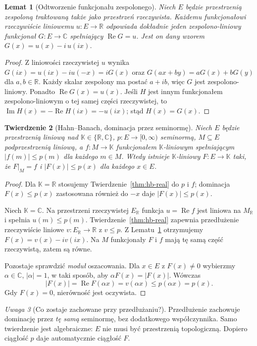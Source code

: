 \documentclass[11pt,a4paper]{article}
\numberwithin{equation}{section}
\theoremstyle{plain}
\newtheorem{twierdzenie}{Twierdzenie}[section]
\newtheorem{lemat}[twierdzenie]{Lemat}
\theoremstyle{definition}
\theoremstyle{remark}
\newtheorem{uwaga}[twierdzenie]{Uwaga}
\newcommand{\R}{\mathbb R}
\newcommand{\C}{\mathbb C}
\newcommand{\K}{\mathbb K}
\begin{document}
\begin{lemat}[Odtworzenie funkcjonału zespolonego]
\label{lem:complex-real-part}
Niech $E$ będzie przestrzenią zespoloną traktowaną także
jako przestrzeń rzeczywista. Każdemu funkcjonałowi
rzeczywiście liniowemu $u:E\to\R$ odpowiada dokładnie
jeden zespolono-liniowy funkcjonał $G:E\to\C$ spełniający
$\operatorname{Re}G=u$. Jest on dany wzorem
$G(x)=u(x)-i\,u(ix)$.
\end{lemat}
\begin{proof}
Z liniowości rzeczywistej $u$ wynika
$G(ix)=u(ix)-i u(-x)=iG(x)$ oraz
$G(ax+by)=aG(x)+bG(y)$ dla $a,b\in\R$.
Każdy skalar zespolony ma postać $a+ib$, więc $G$ jest
zespolono-liniowy. Ponadto $\operatorname{Re}G(x)=u(x)$.
Jeśli $H$ jest innym funkcjonałem zespolono-liniowym
o tej samej części rzeczywistej, to
$\operatorname{Im}H(x)=-\operatorname{Re}H(ix)=-u(ix)$;
stąd $H(x)=G(x)$.
\end{proof}

\begin{twierdzenie}[Hahn--Banach, dominacja przez seminormę]
\label{thm:hb-complex-seminorm}
Niech $E$ będzie przestrzenią liniową nad
$\K\in\{\R,\C\}$, $p:E\to[0,\infty)$ seminormą,
$M\subseteq E$ podprzestrzenią liniową, a
$f:M\to\K$ funkcjonałem $\K$-liniowym spełniającym
$|f(m)|\le p(m)$ dla każdego $m\in M$.
Wtedy istnieje $\K$-liniowy $F:E\to\K$ taki, że
$F|_M=f$ i $|F(x)|\le p(x)$ dla każdego $x\in E$.
\end{twierdzenie}
\begin{proof}
Dla $\K=\R$ stosujemy Twierdzenie~\ref{thm:hb-real}
do $p$ i $f$; dominacja $F(x)\le p(x)$ zastosowana
również do $-x$ daje $|F(x)|\le p(x)$.

Niech $\K=\C$. Na przestrzeni rzeczywistej
$E_{\R}$ funkcja $u=\operatorname{Re}f$ jest liniowa
na $M_{\R}$ i spełnia $u(m)\le p(m)$.
Twierdzenie~\ref{thm:hb-real} zapewnia przedłużenie
rzeczywiście liniowe $v:E_{\R}\to\R$ z $v\le p$.
Z Lematu~\ref{lem:complex-real-part} otrzymujemy
$F(x)=v(x)-iv(ix)$. Na $M$ funkcjonały $F$ i $f$
mają tę samą część rzeczywistą, zatem są równe.

Pozostaje sprawdzić \emph{moduł} oszacowania. Dla
$x\in E$ z $F(x)\ne0$ wybierzmy $\alpha\in\C$,
$|\alpha|=1$, w taki sposób, aby
$\alpha F(x)=|F(x)|$. Wówczas
\[
 |F(x)|=\operatorname{Re}F(\alpha x)
 =v(\alpha x)\le p(\alpha x)=p(x).
\]
Gdy $F(x)=0$, nierówność jest oczywista.
\end{proof}

\begin{uwaga}[Co zostaje zachowane przy przedłużaniu?]
Przedłużenie zachowuje dominację przez \emph{tę samą}
seminormę, bez dodatkowego współczynnika. Samo twierdzenie
jest algebraiczne: $E$ nie musi być przestrzenią topologiczną.
Dopiero ciągłość $p$ daje automatycznie ciągłość $F$.
\end{uwaga}
\end{document}
